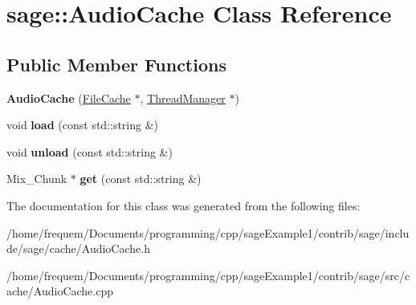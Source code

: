 \hypertarget{classsage_1_1AudioCache}{}\section{sage\+::Audio\+Cache Class Reference}
\label{classsage_1_1AudioCache}
\subsection*{Public Member Functions}
\begin{DoxyCompactItemize}
\item 
\mbox{\label{classsage_1_1AudioCache_a6fc6a4437b98c4ef0aa5d30f05c4c571}} 
{\bfseries Audio\+Cache} (\mbox{\hyperlink{classsage_1_1FileCache}{File\+Cache}} $\ast$, \mbox{\hyperlink{classsage_1_1ThreadManager}{Thread\+Manager}} $\ast$)
\item 
\mbox{\label{classsage_1_1AudioCache_aafae5e1d8e31d8beac67b1326f59712a}} 
void {\bfseries load} (const std\+::string \&)
\item 
\mbox{\label{classsage_1_1AudioCache_a91a1bae14653a9f8b085adffdb2dbacf}} 
void {\bfseries unload} (const std\+::string \&)
\item 
\mbox{\label{classsage_1_1AudioCache_a2a9ba507b403201dfb9d5d7b85160cb4}} 
Mix\+\_\+\+Chunk $\ast$ {\bfseries get} (const std\+::string \&)
\end{DoxyCompactItemize}


The documentation for this class was generated from the following files\+:\begin{DoxyCompactItemize}
\item 
/home/frequem/\+Documents/programming/cpp/sage\+Example1/contrib/sage/include/sage/cache/Audio\+Cache.\+h\item 
/home/frequem/\+Documents/programming/cpp/sage\+Example1/contrib/sage/src/cache/Audio\+Cache.\+cpp\end{DoxyCompactItemize}
